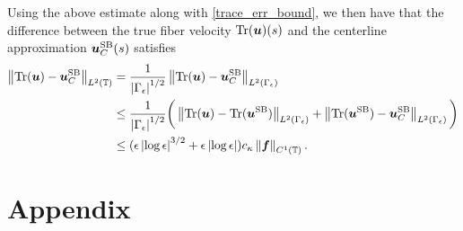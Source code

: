 \documentclass[11pt]{article}
\numberwithin{equation}{section}
\newcommand{\T}{\mathbb{T}}
\newcommand{\bu}{\bm{u}}
\newcommand{\SB}{{\rm SB}}
\newcommand{\abs}[1]{\left\lvert #1 \right\rvert}
\newcommand{\norm}[1]{\left\lVert #1 \right\rVert}
\theoremstyle{definition}
\begin{document}
Using the above estimate along with \eqref{trace_err_bound}, we then have that the difference between the true fiber velocity ${\rm Tr}(\bu)(s)$ and the centerline approximation $\bu^{\SB}_C(s)$ satisfies
\begin{align*}
\norm{{\rm Tr}(\bu) - \bu^{\SB}_C}_{L^2(\T)} &= \frac{1}{\abs{\Gamma_\epsilon}^{1/2}}\norm{{\rm Tr}(\bu) - \bu^{\SB}_C}_{L^2(\Gamma_\epsilon)} \\
& \le \frac{1}{\abs{\Gamma_\epsilon}^{1/2}} \bigg(\norm{{\rm Tr}(\bu) - {\rm Tr}(\bu^{\SB})}_{L^2(\Gamma_\epsilon)} + \norm{{\rm Tr}(\bu^{\SB}) - \bu^{\SB}_C}_{L^2(\Gamma_\epsilon)} \bigg)  \\
&\le (\epsilon\abs{\log\epsilon}^{3/2}+\epsilon\abs{\log\epsilon}) c_\kappa \norm{\bm{f}}_{C^1(\T)}.
\end{align*}


\appendix
\section{Appendix}\label{appendix}
\end{document}
